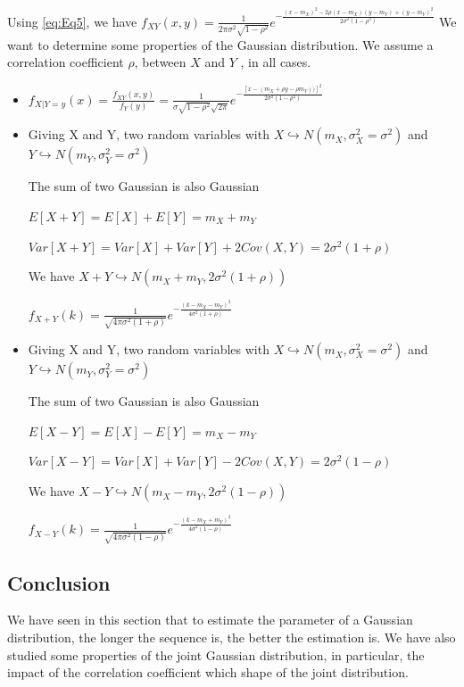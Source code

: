 \documentclass[onecolumn, 12pt]{IEEEtran}
\begin{document}
Using \eqref{eq:Eq5}, we have $f_{XY}(x,y) = \frac { 1 }{ 2\pi \sigma^2 \sqrt { 1-{ \rho  }^{ 2 } }  } { e }^{ -\frac { { (x - m_X) }^{ 2 }-2\rho (x-m_X)(y-m_Y)+{ (y-m_Y) }^{ 2 } }{ 2 \sigma^2 (1-{ \rho  }^{ 2 }) }  }$
\newline
We want to determine some properties of the Gaussian distribution. We assume a correlation coefficient $\rho$, between $X$ and $Y$ , in all cases.
\begin{itemize}
	\item $f_{X|Y=y}(x) = \frac{f_{XY}(x,y)}{f_Y(y)} = \frac{1}{ \sigma \sqrt{1-\rho^2}\sqrt{2\pi}}e^{-\frac{[x - (m_X + \rho y - \rho m_Y))]^2}{2\sigma^2(1-\rho^2)}} $
	\newline
	\item Giving X and Y, two random variables with $X \hookrightarrow N(m_X, \sigma_X^2 = \sigma^2) $ and $Y \hookrightarrow N(m_Y, \sigma_Y^2= \sigma^2) $
		\newline
		
		The sum of two Gaussian is also Gaussian

		$E[X+Y] = E[X] + E[Y] = m_X + m_Y$

		$Var[X+Y] = Var[X] + Var[Y] + 2Cov(X,Y) = 2\sigma^2(1+\rho)$ 
		\newline
		
		We have $X+Y \hookrightarrow N(m_X + m_Y, 2\sigma^2(1+\rho)) $

		$f_{X+Y}(k) = \frac{1}{\sqrt{4\pi\sigma^2(1+\rho)}}e^{-\frac{(k-m_X-m_Y)^2}{4\sigma^2(1+\rho)}}$

	\item Giving X and Y, two random variables with $X \hookrightarrow N(m_X, \sigma_X^2 = \sigma^2) $ and $Y \hookrightarrow N(m_Y, \sigma_Y^2= \sigma^2) $
		\newline
		
		The sum of two Gaussian is also Gaussian

		$E[X-Y] = E[X] - E[Y] = m_X - m_Y$

		$Var[X-Y] = Var[X] + Var[Y] - 2Cov(X,Y) = 2\sigma^2(1-\rho)$ 
		\newline
		
		We have $X-Y \hookrightarrow N(m_X - m_Y, 2\sigma^2(1-\rho)) $
		
		$f_{X-Y}(k) = \frac{1}{\sqrt{4\pi\sigma^2(1-\rho)}}e^{-\frac{(k-m_X+m_Y)^2}{4\sigma^2(1-\rho)}}$ 

\end{itemize}

\subsection*{Conclusion}
We have seen in this section that to estimate the parameter of a Gaussian distribution, the longer the sequence is, the better the estimation is. 
We have also studied some properties of the joint Gaussian distribution, in particular, the impact of the correlation coefficient which shape of the joint distribution.
\end{document}
